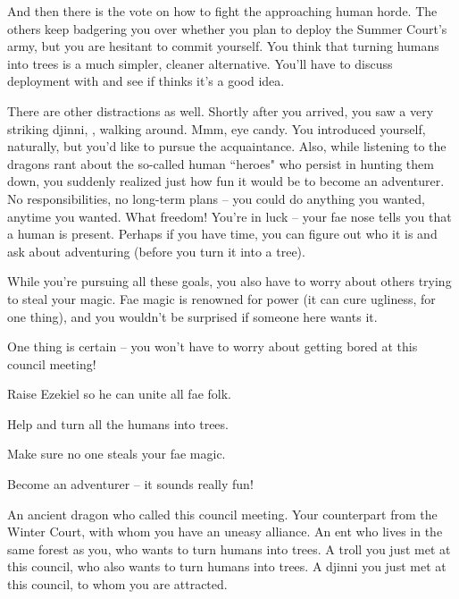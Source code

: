 \documentclass[char]{guildcamp2}
\begin{document}
And then there is the vote on how to fight the approaching human horde.  The others keep badgering you over whether you plan to deploy the Summer Court's army, but you are hesitant to commit yourself.  You think that turning humans into trees is a much simpler, cleaner alternative.  You'll have to discuss deployment with \cBabyFae{} and see if \cBabyFae{\they} thinks it's a good idea.

There are other distractions as well.  Shortly after you arrived, you saw a very striking djinni, \cWizard{}, walking around.  Mmm, eye candy.  You introduced yourself, naturally, but you'd like to pursue the acquaintance.  Also, while listening to the dragons rant about the so-called human ``heroes" who persist in hunting them down, you suddenly realized just how fun it would be to become an adventurer.  No responsibilities, no long-term plans -- you could do anything you wanted, anytime you wanted.  What freedom!  You're in luck -- your fae nose tells you that a human is present.  Perhaps if you have time, you can figure out who it is and ask about adventuring (before you turn it into a tree).  

While you're pursuing all these goals, you also have to worry about others trying to steal your magic.  Fae magic is renowned for power (it can cure ugliness, for one thing), and you wouldn't be surprised if someone here wants it.

One thing is certain -- you won't have to worry about getting bored at this council meeting!


 
\begin{itemz}[Goals]
  \item Raise Ezekiel so he can unite all fae folk.
  \item Help \cEnt{\intro} and \cTroll{\intro} turn all the humans into trees.
  \item Make sure no one steals your fae magic.
  \item Become an adventurer -- it sounds really fun!
\end{itemz}


\begin{contacts}
  \contact{\cOnyx{}} An ancient dragon who called this council meeting.
  \contact{\cBabyFae{}} Your counterpart from the Winter Court, with whom you have an uneasy alliance.
  \contact{\cEnt{}} An ent who lives in the same forest as you, who wants to turn humans into trees.
  \contact{\cTroll{}} A troll you just met at this council, who also wants to turn humans into trees.
  \contact{\cWizard{}} A djinni you just met at this council, to whom you are attracted.
\end{contacts}



\end{document}
